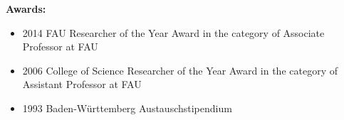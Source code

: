 \documentclass[11pt]{article}
\begin{document}
\bigskip

{\bf Awards:}

\begin{itemize}
\item	2014 FAU Researcher of the Year Award in the category
	of Associate Professor at FAU
\item	2006 College of Science Researcher of the Year Award in the category
	of Assistant Professor at FAU
\item	1993 Baden-W\"urttemberg Austauschstipendium
\end{itemize}
\end{document}
